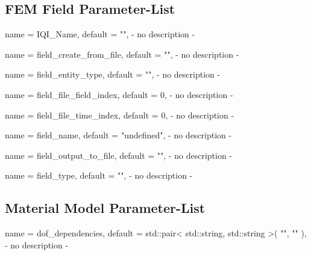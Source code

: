 \subsection{FEM Field Parameter-List}

\begin{parameter}{
    name    = {IQI_Name},
    default = {""},
}
- no description -
\end{parameter}

\begin{parameter}{
    name    = {field_create_from_file},
    default = {""},
}
- no description -
\end{parameter}

\begin{parameter}{
    name    = {field_entity_type},
    default = {""},
}
- no description -
\end{parameter}

\begin{parameter}{
    name    = {field_file_field_index},
    default = {0},
}
- no description -
\end{parameter}

\begin{parameter}{
    name    = {field_file_time_index},
    default = {0},
}
- no description -
\end{parameter}

\begin{parameter}{
    name    = {field_name},
    default = {"undefined"},
}
- no description -
\end{parameter}

\begin{parameter}{
    name    = {field_output_to_file},
    default = {""},
}
- no description -
\end{parameter}

\begin{parameter}{
    name    = {field_type},
    default = {""},
}
- no description -
\end{parameter}

\subsection{Material Model Parameter-List}

\begin{parameter}{
    name    = {dof_dependencies},
    default = {std::pair< std::string, std::string >( "", "" )},
}
- no description -
\end{parameter}

